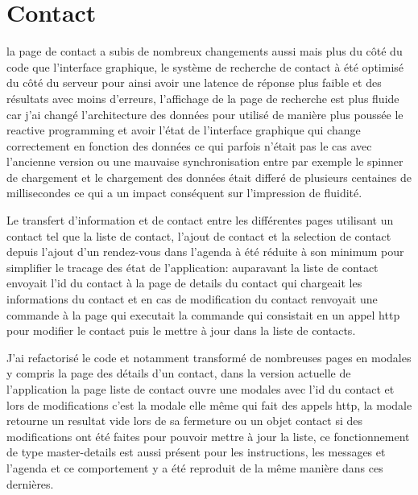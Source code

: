 \section{Contact}

la page de contact a subis de nombreux changements aussi mais plus du côté du code 
que l'interface graphique, le système de recherche de contact à été optimisé du côté 
du serveur pour ainsi avoir une latence de réponse plus faible et des résultats 
avec moins d'erreurs, l'affichage de la page de recherche est plus fluide car j'ai 
changé l'architecture des données pour utilisé de manière plus poussée le reactive 
programming et avoir l'état de l'interface graphique qui change correctement en 
fonction des données ce qui parfois n'était pas le cas avec l'ancienne version 
ou une mauvaise synchronisation entre par exemple le spinner de chargement 
et le chargement des données était differé de plusieurs centaines de millisecondes 
ce qui a un impact conséquent sur l'impression de fluidité. \newline

Le transfert d'information et de contact entre les différentes pages utilisant un contact tel
que la liste de contact, l'ajout de contact et la selection de contact depuis l'ajout 
d'un rendez-vous dans l'agenda à été réduite à son minimum pour simplifier le tracage 
des état de l'application: auparavant la liste de contact envoyait l'id du contact 	
à la page de details du contact qui chargeait les informations du contact et en cas de modification 
du contact renvoyait une commande à la page qui executait la commande qui consistait 
en un appel http pour modifier le contact puis le mettre à jour dans la liste de contacts.
\newline

J'ai refactorisé le code et notamment transformé de nombreuses pages en modales y compris la page
des détails d'un contact, dans la version actuelle de l'application la page liste de contact 
ouvre une modales avec l'id du contact et lors de modifications c'est la modale
elle même qui fait des appels http, la modale retourne un resultat vide lors de sa fermeture 
ou un objet contact si des modifications ont été faites pour pouvoir mettre à jour la liste, 
ce fonctionnement de type master-details est aussi présent pour les instructions, les messages 
et l'agenda et ce comportement y a été reproduit de la même manière dans ces dernières. 

